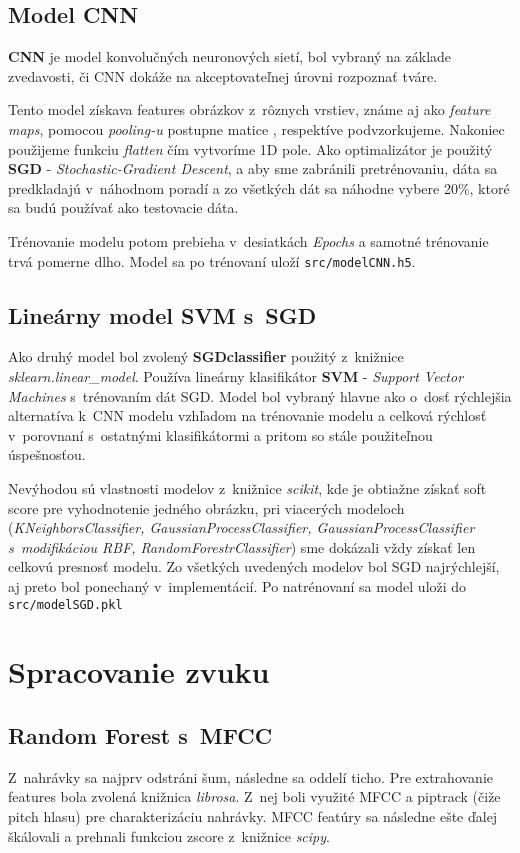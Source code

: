 \documentclass[11pt, a4paper]{article}
\begin{document}
\subsection{Model CNN}
\textbf{CNN} je model konvolučných neuronových sietí, bol vybraný na základe zvedavosti, či CNN dokáže na akceptovateľnej úrovni rozpoznať tváre. 

Tento model získava features obrázkov z~rôznych vrstiev, známe aj ako \emph{feature maps}, pomocou \emph{pooling-u} postupne matice , respektíve podvzorkujeme. Nakoniec použijeme funkciu \emph{flatten} čím vytvoríme 1D pole. Ako optimalizátor je použitý \textbf{SGD} - \emph{Stochastic-Gradient Descent}, a aby sme zabránili pretrénovaniu, dáta sa predkladajú v~náhodnom poradí a zo všetkých dát sa náhodne vybere 20\%, ktoré sa budú používať ako testovacie dáta. 

Trénovanie modelu potom prebieha v~desiatkách \emph{Epochs} a samotné trénovanie trvá pomerne dlho. Model sa po trénovaní uloží \texttt{src/modelCNN.h5}.

\subsection{Lineárny model SVM s~SGD}
Ako druhý model bol zvolený \textbf{SGDclassifier} použitý z~knižnice \emph{sklearn.linear\_model}. Používa lineárny klasifikátor \textbf{SVM} - \emph{Support Vector Machines} s~trénovaním dát SGD. Model bol vybraný hlavne ako o~dosť rýchlejšia alternatíva k~CNN modelu vzhľadom na trénovanie modelu a celková rýchlosť v~porovnaní s~ostatnými klasifikátormi a pritom so stále použiteľnou úspešnosťou. 

Nevýhodou sú vlastnosti modelov z~knižnice \emph{scikit}, kde je obtiažne získať soft score pre vyhodnotenie jedného obrázku, pri viacerých modeloch (\emph{KNeighborsClassifier, GaussianProcessClassifier, GaussianProcessClassifier s~modifikáciou RBF, RandomForestrClassifier}) sme dokázali vždy získať len celkovú presnosť modelu. Zo všetkých uvedených modelov bol SGD najrýchlejší, aj preto bol ponechaný v~implementácií. Po natrénovaní sa model uloži do \texttt{src/modelSGD.pkl}
	\section{Spracovanie zvuku}
			\subsection{Random Forest s~MFCC}
			Z~nahrávky sa najprv odstráni šum, následne sa oddelí ticho. Pre extrahovanie features bola zvolená knižnica \emph{librosa}. Z~nej boli využité MFCC a piptrack (čiže pitch hlasu) pre charakterizáciu nahrávky. MFCC featúry sa následne ešte ďalej škálovali a prehnali funkciou zscore z~knižnice \emph{scipy}.
			
\end{document}
